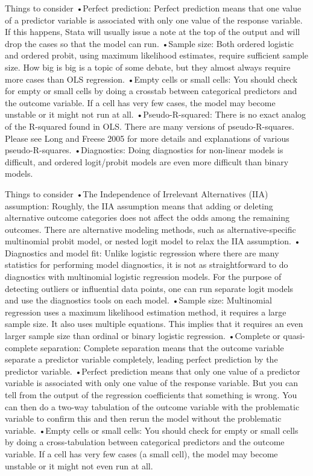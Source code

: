 

Things to consider
•Perfect prediction: Perfect prediction means that one value of a predictor variable is associated with only one value of the response variable. If this happens, Stata will usually issue a note at the top of the output and will drop the cases so that the model can run.
•Sample size: Both ordered logistic and ordered probit, using maximum likelihood estimates, require sufficient sample size. How big is big is a topic of some debate, but they almost always require more cases than OLS regression.
•Empty cells or small cells: You should check for empty or small cells by doing a crosstab between categorical predictors and the outcome variable. If a cell has very few cases, the model may become unstable or it might not run at all.
•Pseudo-R-squared: There is no exact analog of the R-squared found in OLS. There are many versions of pseudo-R-squares. Please see Long and Freese 2005 for more details and explanations of various pseudo-R-squares.
•Diagnostics: Doing diagnostics for non-linear models is difficult, and ordered logit/probit models are even more difficult than binary models.




Things to consider
•The Independence of Irrelevant Alternatives (IIA) assumption: Roughly, the IIA assumption means that adding or deleting alternative outcome categories does not affect the odds among the remaining outcomes. There are alternative modeling methods, such as alternative-specific multinomial probit model, or nested logit model to relax the IIA assumption.
• Diagnostics and model fit: Unlike logistic regression where there are many statistics for performing model diagnostics, it is not as straightforward to do diagnostics with multinomial logistic regression models. For the purpose of detecting outliers or influential data points, one can run separate logit models and use the diagnostics tools on each model. 
•Sample size: Multinomial regression uses a maximum likelihood estimation method, it requires a large sample size. It also uses multiple equations. This implies that it requires an even larger sample size than ordinal or binary logistic regression.
•Complete or quasi-complete separation: Complete separation means that the outcome variable separate a predictor variable completely, leading perfect prediction by the predictor variable.
•Perfect prediction means that only one value of a predictor variable is associated with only one value of the response variable. But you can tell from the output of the regression coefficients that something is wrong. You can then do a two-way tabulation of the outcome variable with the problematic variable to confirm this and then rerun the model without the problematic variable.
•Empty cells or small cells: You should check for empty or small cells by doing a cross-tabulation between categorical predictors and the outcome variable. If a cell has very few cases (a small cell), the model may become unstable or it might not even run at all.


